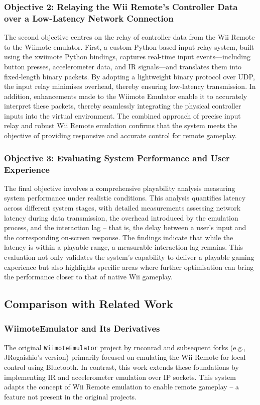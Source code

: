 \subsubsection{Objective 2: Relaying the Wii Remote's Controller Data over a Low-Latency Network Connection}
The second objective centres on the relay of controller data from the Wii Remote
to the Wiimote emulator. First, a custom Python-based input relay system, built
using the xwiimote Python bindings, captures real-time input events—including
button presses, accelerometer data, and IR signals—and translates them into
fixed-length binary packets. By adopting a lightweight binary protocol over UDP,
the input relay minimises overhead, thereby ensuring low-latency transmission.
In addition, enhancements made to the Wiimote Emulator enable it to accurately
interpret these packets, thereby seamlessly integrating the physical controller
inputs into the virtual environment. The combined approach of precise input
relay and robust Wii Remote emulation confirms that the system meets the
objective of providing responsive and accurate control for remote gameplay.

\subsubsection{Objective 3: Evaluating System Performance and User Experience}
The final objective involves a comprehensive playability analysis measuring
system performance under realistic conditions. This analysis quantifies latency
across different system stages, with detailed measurements assessing network
latency during data transmission, the overhead introduced by the emulation
process, and the interaction lag\cite{volkerseekerBestPaper} -- that is, the delay between a user’s input
and the corresponding on-screen response. The findings indicate that while the
latency is within a playable range, a measurable interaction lag remains. This
evaluation not only validates the system's capability to deliver a playable
gaming experience but also highlights specific areas where further optimisation
can bring the performance closer to that of native Wii gameplay.


\subsection{Comparison with Related Work}

\subsubsection{WiimoteEmulator and Its Derivatives}
The original \texttt{WiimoteEmulator} project by rnconrad and subsequent forks
(e.g., JRogaishio's version) primarily focused on emulating the Wii Remote for
local control using Bluetooth. In contrast, this work extends these foundations
by implementing IR and accelerometer emulation over IP sockets. This system adapts the concept of
Wii Remote emulation to enable remote gameplay -- a feature not present in the
original projects.

